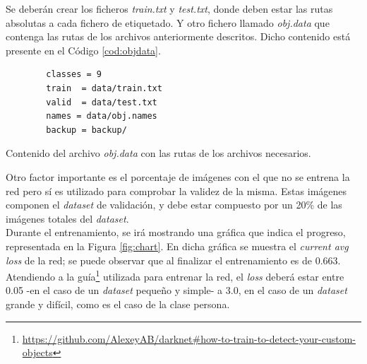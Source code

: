 Se deberán crear los ficheros \textit{train.txt} y \textit{test.txt}, donde deben estar las rutas absolutas a cada fichero de etiquetado. Y otro fichero llamado \textit{obj.data} que contenga las rutas de los archivos anteriormente descritos. Dicho contenido está presente en el Código \ref{cod:objdata}.\\

\begin{code}[h]
	\begin{lstlisting}
		classes = 9
		train  = data/train.txt
		valid  = data/test.txt
		names = data/obj.names
		backup = backup/
	\end{lstlisting}
	\caption[Contenido del archivo \textit{obj.data} con las rutas de los archivos necesarios.]{Contenido del archivo \textit{obj.data} con las rutas de los archivos necesarios.}
	\label{cod:objdata}
\end{code}

Otro factor importante es el porcentaje de imágenes con el que no se entrena la red pero sí es utilizado para comprobar la validez de la misma. Estas imágenes componen el \textit{dataset} de validación, y debe estar compuesto por un 20\% de las imágenes totales del \textit{dataset}.\\

Durante el entrenamiento, se irá mostrando una gráfica que indica el progreso, representada en la Figura \ref{fig:chart}. En dicha gráfica se muestra el \textit{current avg loss} de la red; se puede observar que al finalizar el entrenamiento es de 0.663. Atendiendo a la guía\footnote{\url{https://github.com/AlexeyAB/darknet\#how-to-train-to-detect-your-custom-objects}} utilizada para entrenar la red, el \textit{loss} deberá estar entre 0.05 -en el caso de un \textit{dataset} pequeño y simple- a 3.0, en el caso de un \textit{dataset} grande y difícil, como es el caso de la clase persona.\\

